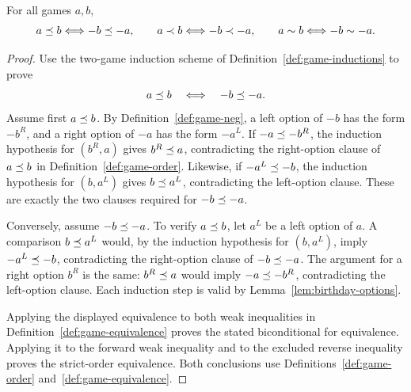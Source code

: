 \begin{theorem}
  \label{thm:game-neg-order}
  \leanok
  For all games \(a,b\),
  \[
    a\preceq b\Longleftrightarrow -b\preceq-a,
    \qquad
    a\prec b\Longleftrightarrow -b\prec-a,
    \qquad
    a\sim b\Longleftrightarrow -b\sim-a.
  \]
\end{theorem}
\begin{proof}
  \leanok
  Use the two-game induction scheme of Definition~\ref{def:game-inductions} to
  prove
  \[
    a\preceq b\quad\Longleftrightarrow\quad -b\preceq-a.
  \]
  Assume first \(a\preceq b\).  By Definition~\ref{def:game-neg}, a left
  option of \(-b\) has the form \(-b^R\), and a right option of \(-a\) has
  the form \(-a^L\).  If \(-a\preceq-b^R\), the induction hypothesis for
  \((b^R,a)\) gives \(b^R\preceq a\), contradicting the right-option clause
  of \(a\preceq b\) in Definition~\ref{def:game-order}.  Likewise, if
  \(-a^L\preceq-b\), the induction hypothesis for \((b,a^L)\) gives
  \(b\preceq a^L\), contradicting the left-option clause.  These are exactly
  the two clauses required for \(-b\preceq-a\).

  Conversely, assume \(-b\preceq-a\).  To verify \(a\preceq b\), let
  \(a^L\) be a left option of \(a\).  A comparison \(b\preceq a^L\) would,
  by the induction hypothesis for \((b,a^L)\), imply
  \(-a^L\preceq-b\), contradicting the right-option clause of
  \(-b\preceq-a\).  The argument for a right option \(b^R\) is the same:
  \(b^R\preceq a\) would imply \(-a\preceq-b^R\), contradicting the
  left-option clause.  Each induction step is valid by
  Lemma~\ref{lem:birthday-options}.

  Applying the displayed equivalence to both weak inequalities in
  Definition~\ref{def:game-equivalence} proves the stated biconditional for equivalence.
  Applying it to the forward weak
  inequality and to the excluded reverse inequality proves the strict-order
  equivalence.  Both conclusions use
  Definitions~\ref{def:game-order} and~\ref{def:game-equivalence}.
\end{proof}


